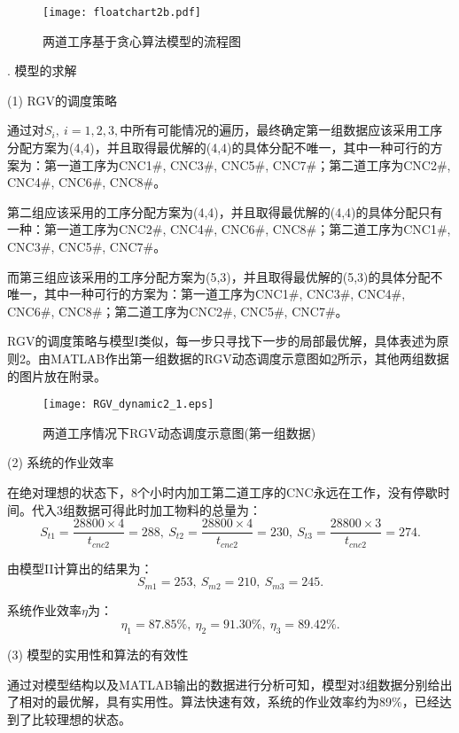 \documentclass[no-math,withoutpreface,bwprint]{cumcmthesis} %
\numberwithin{equation}{section}
\numberwithin{figure}{section}
\numberwithin{table}{section}
\begin{document}
\begin{figure}[!htbp]
	\vspace{-1.5cm}
	\hspace{-1cm}
	\texttt{[image: floatchart2b.pdf]}
	\caption{两道工序基于贪心算法模型的流程图}
     \label{pro2}
\end{figure}

. 模型的求解

\noindent(1) RGV的调度策略

通过对$S_i,\ i=1,2,3,$中所有可能情况的遍历，最终确定第一组数据应该采用工序分配方案为(4,4)，并且取得最优解的(4,4)的具体分配不唯一，其中一种可行的方案为：第一道工序为CNC1\#, CNC3\#, CNC5\#, CNC7\#；第二道工序为CNC2\#, CNC4\#, CNC6\#, CNC8\#。

第二组应该采用的工序分配方案为(4,4)，并且取得最优解的(4,4)的具体分配只有一种：第一道工序为CNC2\#, CNC4\#, CNC6\#, CNC8\#；第二道工序为CNC1\#, CNC3\#, CNC5\#, CNC7\#。

而第三组应该采用的工序分配方案为(5,3)，并且取得最优解的(5,3)的具体分配不唯一，其中一种可行的方案为：第一道工序为CNC1\#, CNC3\#, CNC4\#, CNC6\#, CNC8\#；第二道工序为CNC2\#, CNC5\#, CNC7\#。

RGV的调度策略与模型I类似，每一步只寻找下一步的局部最优解，具体表述为原则2。由MATLAB作出第一组数据的RGV动态调度示意图如\ref{figdy2}所示，其他两组数据的图片放在附录。

\begin{figure}[!htbp]
	\hspace{-0.5cm}
	\texttt{[image: RGV\_dynamic2\_1.eps]}
	\caption{两道工序情况下RGV动态调度示意图(第一组数据)}
     \label{figdy2}
\end{figure}

\noindent(2) 系统的作业效率

在绝对理想的状态下，8个小时内加工第二道工序的CNC永远在工作，没有停歇时间。代入3组数据可得此时加工物料的总量为：
$$S_{t1}=\dfrac{28800\times4}{t_{cnc2}}=288,
\ S_{t2}=\dfrac{28800\times4}{t_{cnc2}}=230,
\ S_{t3}=\dfrac{28800\times3}{t_{cnc2}}=274.$$

由模型II计算出的结果为：$$S_{m1}=253,\ S_{m2}=210,\ S_{m3}=245.$$

系统作业效率$\eta$为：
$$\eta_1=87.85\%,\ \eta_2=91.30\%,\ \eta_3=89.42\%.$$

\noindent(3) 模型的实用性和算法的有效性

通过对模型结构以及MATLAB输出的数据进行分析可知，模型对3组数据分别给出了相对的最优解，具有实用性。算法快速有效，系统的作业效率约为89\%，已经达到了比较理想的状态。
\end{document}
